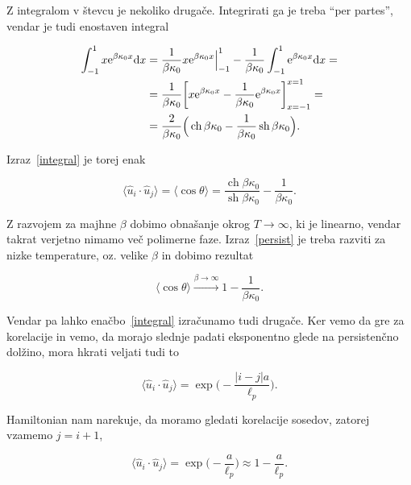 \documentclass[12pt, a4 paper]{article}
\renewcommand{\u}{
	\ensuremath{\hat{u}}
}
\renewcommand{\d}{
	\ensuremath{\mathrm{d}}
}
\newcommand{\e}{
	\ensuremath{\mathrm{e}}
}
\newcommand{\sh}{
	\operatorname{sh}
}
\newcommand{\ch}{
	\operatorname{ch}
}
\begin{document}
Z integralom v \v stevcu je nekoliko druga\v ce. Integrirati ga je treba "`per partes"', vendar je tudi
enostaven integral

\begin{align}
	\int_{-1}^1x\e^{\beta\kappa_0x}\d x &= \frac{1}{\beta\kappa_0}x\e^{\beta\kappa_0x}\Big|_{-1}^1
		 - \frac{1}{\beta\kappa_0} \int_{-1}^1\e^{\beta\kappa_0x}\d x = \notag \\
	&= \frac{1}{\beta\kappa_0}\bigg[x\e^{\beta\kappa_0x} - \frac{1}{\beta\kappa_0}
		\e^{\beta\kappa_0x}\bigg]_{x=-1}^{x=1} = \notag \\
	&= \frac{2}{\beta\kappa_0}\Big(\ch\beta\kappa_0 - \frac{1}{\beta\kappa_0}\sh\beta\kappa_0\Big).
\end{align}

Izraz~\eqref{integral} je torej enak

\begin{equation}
	\langle\u_i\cdot\u_j\rangle = \langle\cos\theta\rangle = \frac{\ch\beta\kappa_0}{\sh\beta\kappa_0} -
		\frac{1}{\beta\kappa_0}.
	\label{persist}
\end{equation}

Z razvojem za majhne $\beta$ dobimo obna\v sanje okrog $T \to \infty$, ki je linearno, vendar takrat verjetno
nimamo ve\v c polimerne faze. Izraz~\eqref{persist} je treba razviti za nizke temperature, oz. velike $\beta$
in dobimo rezultat

\begin{equation}
	\langle\cos\theta\rangle \stackrel{\beta \to \infty}{\longrightarrow} 1 - \frac{1}{\beta\kappa_0}.
	\label{betavelik}
\end{equation}

Vendar pa lahko ena\v cbo~\eqref{integral} izra\v cunamo tudi druga\v ce. Ker vemo da gre za korelacije in
vemo, da morajo slednje padati eksponentno glede na persisten\v cno dol\v zino, mora hkrati veljati tudi to

\begin{equation}
	\langle\u_i\cdot\u_j\rangle = \exp\bigg(-\frac{|i - j|a}{\ell_p}\bigg).
\end{equation}

Hamiltonian nam narekuje, da moramo gledati korelacije sosedov, zatorej vzamemo $j = i + 1$,

\begin{equation}
	\langle\u_i\cdot\u_j\rangle = \exp\bigg(-\frac{a}{\ell_p}\bigg) \approx 1 - \frac{a}{\ell_p}.
	\label{ellp}
\end{equation}
\end{document}
